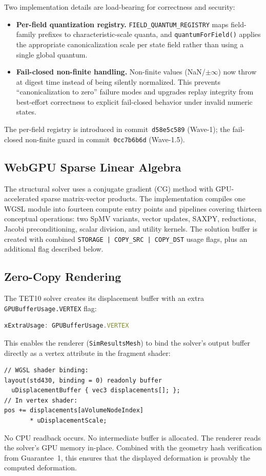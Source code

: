\documentclass[journal]{IEEEtran}
\begin{document}
Two implementation details are load-bearing for correctness and security:
\begin{itemize}
  \item \textbf{Per-field quantization registry.}
    \texttt{FIELD\_QUANTUM\_REGISTRY} maps field-family prefixes to
    characteristic-scale quanta, and \texttt{quantumForField()} applies the
    appropriate canonicalization scale per state field rather than using a
    single global quantum.
  \item \textbf{Fail-closed non-finite handling.}
    Non-finite values (NaN/\(\pm\infty\)) now throw at digest time instead of
    being silently normalized. This prevents ``canonicalization to zero''
    failure modes and upgrades replay integrity from best-effort correctness
    to explicit fail-closed behavior under invalid numeric states.
\end{itemize}

The per-field registry is introduced in commit~\texttt{d58e5c589} (Wave-1);
the fail-closed non-finite guard in commit~\texttt{0cc7b6b6d} (Wave-1.5).

\subsection{WebGPU Sparse Linear Algebra}

The structural solver uses a conjugate gradient (CG) method with
GPU-accelerated sparse matrix-vector products. The implementation compiles
one WGSL module into fourteen compute entry points and pipelines covering
thirteen conceptual operations: two SpMV variants, vector updates, SAXPY,
reductions, Jacobi preconditioning, scalar division, and utility kernels.
The solution buffer is created with combined
\texttt{STORAGE~|~COPY\_SRC~|~COPY\_DST} usage flags, plus an additional
flag described below.

\subsection{Zero-Copy Rendering}
\label{sec:implementation:zerocopy}

The TET10 solver creates its displacement buffer with an extra
\texttt{GPUBufferUsage.VERTEX} flag:
\begin{lstlisting}[language=TypeScript]
xExtraUsage: GPUBufferUsage.VERTEX
\end{lstlisting}
This enables the renderer (\texttt{SimResultsMesh}) to bind the solver's
output buffer directly as a vertex attribute in the fragment shader:
\begin{lstlisting}[language={}]
// WGSL shader binding:
layout(std430, binding = 0) readonly buffer
  uDisplacementBuffer { vec3 displacements[]; };
// In vertex shader:
pos += displacements[aVolumeNodeIndex]
       * uDisplacementScale;
\end{lstlisting}
No CPU readback occurs. No intermediate buffer is allocated. The renderer
reads the solver's GPU memory in-place. Combined with the geometry hash
verification from Guarantee~1, this ensures that the displayed deformation
is provably the computed deformation.
\end{document}
